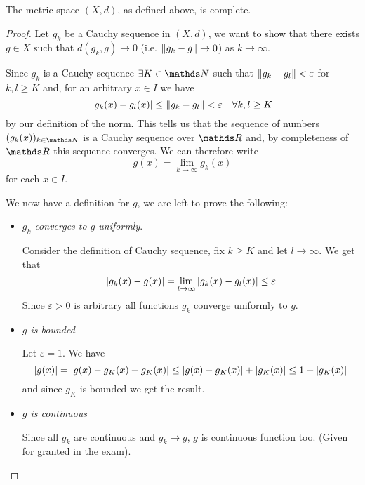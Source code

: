 \documentclass[12pt]{extarticle}
\numberwithin{equation}{section}
\begin{document}
\begin{theorem}{}{}
	The metric space $(X, d)$, as defined above, is complete.
\end{theorem}
\begin{proof}
	Let $g_k$ be a Cauchy sequence in $(X, d)$,
	we want to show that there exists $g \in X$ such that $d(g_k, g) \to 0$ (i.e. $\norm{g_k - g} \to 0$) as $k \to \infty$.

	Since $g_k$ is a Cauchy sequence $\exists K \in \N$ such that $\norm{g_k - g_l} < \varepsilon$ for $k, l \geq K$ and, for an arbitrary $x \in I$ we have
	\begin{equation}
		\abs{g_k(x)-g_l(x)} \leq \norm{g_k - g_l} < \varepsilon \quad \forall k, l \geq K
	\end{equation}
	by our definition of the norm.
	This tells us that the sequence of numbers $(g_k(x))_{k \in \N}$ is a Cauchy sequence over $\R$ and, by completeness of $\R$ this sequence converges.
	We can therefore write
	\begin{equation}
		g(x) = \lim_{k \to \infty} g_k(x)
	\end{equation}
	for each $x \in I$.

	We now have a definition for $g$, we are left to prove the following:
	\begin{itemize}
		\item \emph{$g_k$ converges to $g$ uniformly}.

		      Consider the definition of Cauchy sequence, fix $k \geq K$ and let $l \to \infty$.
		      We get that
		      \begin{equation}
			      \abs{g_k(x) - g(x)} = \lim_{l \to \infty} \abs{g_k(x) - g_l(x)} \leq \varepsilon
		      \end{equation}
		      Since $\varepsilon > 0$ is arbitrary all functions $g_k$ converge uniformly to $g$.

		\item \emph{$g$ is bounded}

		      Let $\varepsilon = 1$.
		      We have
		      \begin{equation}
			      \abs{g(x)} = \abs{g(x) - g_K(x) + g_K(x)} \leq \abs{g(x) - g_K(x)} + \abs{g_K(x)} \leq 1 + \abs{g_K(x)}
		      \end{equation}
		      and since $g_K$ is bounded we get the result.

		\item \emph{$g$ is continuous}

		      Since all $g_k$ are continuous and $g_k \to g$, $g$ is continuous function too.
		      (Given for granted in the exam).
	\end{itemize}
\end{proof}
\end{document}
